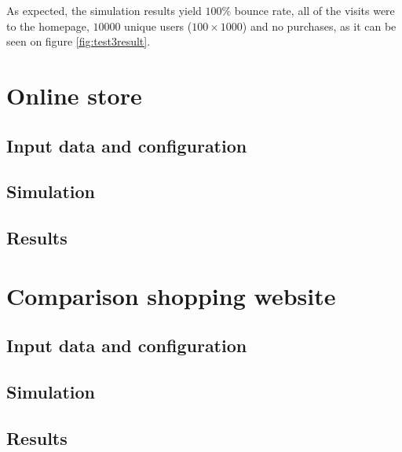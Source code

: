 As expected, the simulation results yield $100\%$ bounce rate, all of the 
visits were to the homepage, $10000$ unique users ($100 \times 1000$) and no 
purchases, as it can be seen on figure \ref{fig:test3result}.

\section{Online store}

\subsection{Input data and configuration}
\subsection{Simulation}
\subsection{Results}

\section{Comparison shopping website}

\subsection{Input data and configuration}
\subsection{Simulation}
\subsection{Results}
